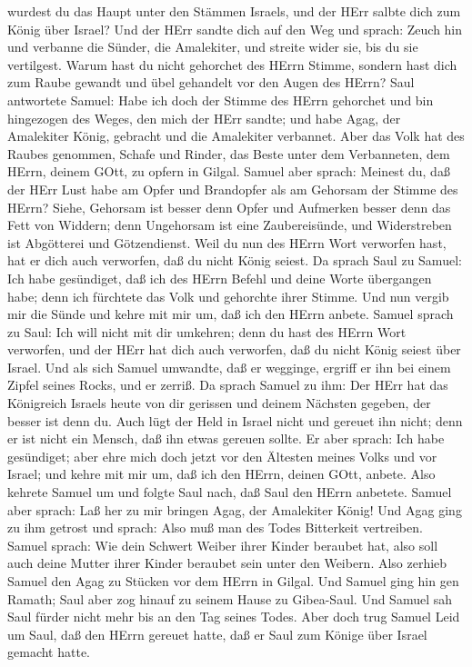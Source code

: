 wurdest du das Haupt unter den Stämmen Israels, und der HErr salbte dich
zum König über Israel?  Und der HErr sandte dich auf den
Weg und sprach: Zeuch hin und verbanne die Sünder, die Amalekiter, und
streite wider sie, bis du sie vertilgest.  Warum hast du
nicht gehorchet des HErrn Stimme, sondern hast dich zum Raube gewandt
und übel gehandelt vor den Augen des HErrn?  Saul
antwortete Samuel: Habe ich doch der Stimme des HErrn gehorchet und bin
hingezogen des Weges, den mich der HErr sandte; und habe Agag, der
Amalekiter König, gebracht und die Amalekiter verbannet. 
Aber das Volk hat des Raubes genommen, Schafe und Rinder, das Beste
unter dem Verbanneten, dem HErrn, deinem GOtt, zu opfern in Gilgal.
 Samuel aber sprach: Meinest du, daß der HErr Lust habe am
Opfer und Brandopfer als am Gehorsam der Stimme des HErrn? Siehe,
Gehorsam ist besser denn Opfer und Aufmerken besser denn das Fett von
Widdern;  denn Ungehorsam ist eine Zaubereisünde, und
Widerstreben ist Abgötterei und Götzendienst. Weil du nun des HErrn Wort
verworfen hast, hat er dich auch verworfen, daß du nicht König seiest.
 Da sprach Saul zu Samuel: Ich habe gesündiget, daß ich des
HErrn Befehl und deine Worte übergangen habe; denn ich fürchtete das
Volk und gehorchte ihrer Stimme.  Und nun vergib mir die
Sünde und kehre mit mir um, daß ich den HErrn anbete. 
Samuel sprach zu Saul: Ich will nicht mit dir umkehren; denn du hast des
HErrn Wort verworfen, und der HErr hat dich auch verworfen, daß du nicht
König seiest über Israel.  Und als sich Samuel umwandte,
daß er wegginge, ergriff er ihn bei einem Zipfel seines Rocks, und er
zerriß.  Da sprach Samuel zu ihm: Der HErr hat das
Königreich Israels heute von dir gerissen und deinem Nächsten gegeben,
der besser ist denn du.  Auch lügt der Held in Israel nicht
und gereuet ihn nicht; denn er ist nicht ein Mensch, daß ihn etwas
gereuen sollte.  Er aber sprach: Ich habe gesündiget; aber
ehre mich doch jetzt vor den Ältesten meines Volks und vor Israel; und
kehre mit mir um, daß ich den HErrn, deinen GOtt, anbete. 
Also kehrete Samuel um und folgte Saul nach, daß Saul den HErrn
anbetete.  Samuel aber sprach: Laß her zu mir bringen Agag,
der Amalekiter König! Und Agag ging zu ihm getrost und sprach: Also muß
man des Todes Bitterkeit vertreiben.  Samuel sprach: Wie
dein Schwert Weiber ihrer Kinder beraubet hat, also soll auch deine
Mutter ihrer Kinder beraubet sein unter den Weibern. Also zerhieb Samuel
den Agag zu Stücken vor dem HErrn in Gilgal.  Und Samuel
ging hin gen Ramath; Saul aber zog hinauf zu seinem Hause zu Gibea-Saul.
 Und Samuel sah Saul fürder nicht mehr bis an den Tag
seines Todes. Aber doch trug Samuel Leid um Saul, daß den HErrn gereuet
hatte, daß er Saul zum Könige über Israel gemacht hatte.

